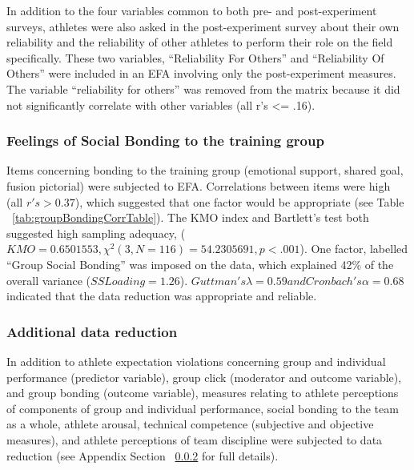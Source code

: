 In addition to the four variables common to both pre- and post-experiment surveys, athletes were also asked in the post-experiment survey about their own reliability and the reliability of other athletes to perform their role on the field specifically. These two variables, ``Reliability For Others'' and ``Reliability Of Others'' were included in an EFA involving only the post-experiment measures.  The variable ``reliability for others'' was removed from the matrix because it did not significantly correlate with other variables (all r's <= .16).

\subsubsection{Feelings of Social Bonding to the training group}

Items concerning bonding to the training group (emotional support, shared goal, fusion pictorial) were subjected to EFA.  Correlations between items were high (all $r's > 0.37$), which suggested that one factor would be appropriate (see Table ~\ref{tab:groupBondingCorrTable}). The KMO index and Bartlett's test both suggested high sampling adequacy, ($KMO =  0.6501553, \chi^2(3, N = 116) = 54.2305691, p < .001$).
One factor, labelled ``Group Social Bonding'' was imposed on the data, which explained 42\% of the overall variance ($SS Loading = 1.26$). $Guttman's \lambda = 0.59 and Cronbach's \alpha = 0.68$ indicated that the data reduction was appropriate and reliable.

\subsubsection{Additional data reduction}
In addition to athlete expectation violations concerning group and individual performance (predictor variable), group click (moderator and outcome variable), and group bonding (outcome variable), measures relating to athlete perceptions of components of group and individual performance, social bonding to the team as a whole, athlete arousal, technical competence (subjective and objective measures), and athlete perceptions of team discipline were subjected to data reduction (see Appendix Section ~\ref{} for full details).


